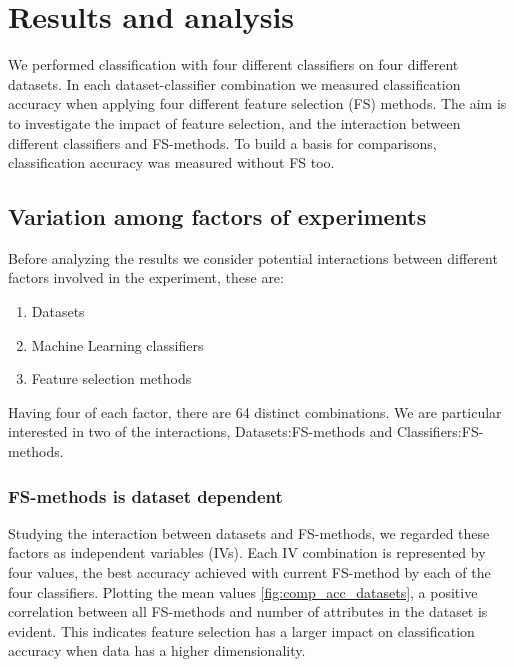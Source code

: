 \chapter{Results and analysis}

We performed classification with four different classifiers on four different datasets. In each dataset-classifier combination we measured classification accuracy when applying four different feature selection (FS) methods. The aim is to investigate the impact of feature selection, and the interaction between different classifiers and FS-methods. To build a basis for comparisons, classification accuracy was measured without FS too.

\section{Variation among factors of experiments}
\label{Variation_among_factors}

Before analyzing the results we consider potential interactions between different factors involved in the experiment, these are:

\begin{enumerate}
  \item Datasets
  \item Machine Learning classifiers
  \item Feature selection methods
\end{enumerate}

Having four of each factor, there are 64 distinct combinations. We are particular interested in two of the interactions, Datasets:FS-methods and Classifiers:FS-methods.

\subsection{FS-methods is dataset dependent}

Studying the interaction between datasets and FS-methods, we regarded these factors as independent variables (IVs). Each IV combination is represented by four values, the best accuracy achieved with current FS-method by each of the four classifiers. Plotting the mean values \ref{fig:comp_acc_datasets}, a positive correlation between all FS-methods and number of attributes in the dataset is evident. This indicates feature selection has a larger impact on classification accuracy when data has a higher dimensionality.



